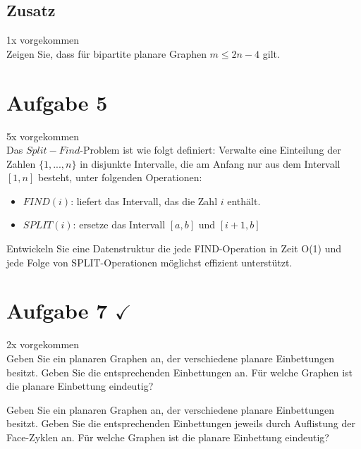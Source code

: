 \documentclass[10pt,a4paper]{article}
\begin{document}
\subsection*{Zusatz}
	1x vorgekommen \\
	Zeigen Sie, dass für bipartite planare Graphen $m\leq2n-4$ gilt.
	
\section*{Aufgabe 5}
	5x vorgekommen \\
	Das $Split-Find$-Problem ist wie folgt definiert: Verwalte eine Einteilung der Zahlen $\{1,...,n\}$ in disjunkte Intervalle, die am Anfang nur aus dem Intervall $[1,n]$ besteht, unter folgenden Operationen:
	\begin{itemize}
		\item $FIND(i)$: liefert das Intervall, das die Zahl $i$ enthält.
		\item $SPLIT(i)$: ersetze das Intervall $[a,b]$ und $[i+1,b]$
	\end{itemize}
	Entwickeln Sie eine Datenstruktur die jede FIND-Operation in Zeit O(1) und jede Folge von SPLIT-Operationen möglichst effizient unterstützt.
	
%	
	
\section*{Aufgabe 7 $\checkmark$} 
	2x vorgekommen \\
	Geben Sie ein planaren Graphen an, der verschiedene planare Einbettungen besitzt. Geben Sie die entsprechenden Einbettungen an. Für welche Graphen ist die planare Einbettung eindeutig?
	
	Geben Sie ein planaren Graphen an, der verschiedene planare Einbettungen besitzt. Geben Sie die entsprechenden Einbettungen jeweils durch Auflistung der Face-Zyklen an. Für welche Graphen ist die planare Einbettung eindeutig?
	
\end{document}

